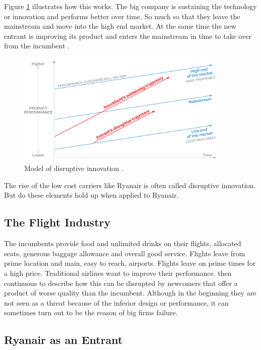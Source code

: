 \documentclass[a4paper, 11pt]{article}
\begin{document}
Figure \ref{fig:graph1} illustrates how this works. The big company is sustaining the technology or innovation and performs better over time. So much so that they leave the mainstream and move into the high end market. At the same time the new entrant is improving its product and enters the mainstream in time to take over from the incumbent \citep{Christensen97}.

\begin{figure}[h!]
    \centering
    \includegraphics[width=0.9\textwidth]{big-model.png}
    \caption{Model of disruptive innovation \citep{Christensen2015}.}
    \label{fig:graph1}
\end{figure}

The rise of the low cost carriers like Ryanair is often called disruptive innovation.
But do these elements hold up when applied to Ryanair.


\subsection{The Flight Industry}


The incumbents provide food and unlimited drinks on their flights, allocated seats, generous baggage allowance and overall good service. Flights leave from prime location and main, easy to reach, airports. Flights leave on prime times for a high price. Traditional airlines want to improve their performance. \cite{Christensen97} then continuous to describe how this can be disrupted by newcomers that offer a product of worse quality than the incumbent. Although in the beginning they are not seen as a threat because of the inferior design or performance, it can sometimes turn out to be the reason of big firms failure.

\subsection{Ryanair as an Entrant}
\end{document}
